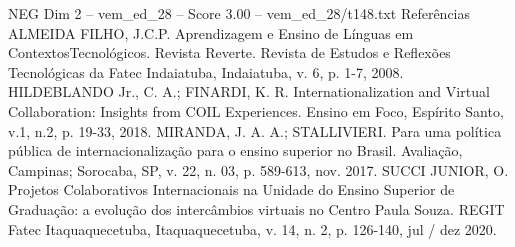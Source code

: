 \begin{textsample}{NEG Dim 2 – vem\_ed\_28 – Score 3.00 – vem\_ed\_28/t148.txt}
Referências ALMEIDA FILHO, J.C.P.
Aprendizagem e Ensino de Línguas em ContextosTecnológicos.
Revista Reverte.
Revista de Estudos e Reflexões Tecnológicas da Fatec Indaiatuba, Indaiatuba, v. 6, p. 1-7, 2008.
HILDEBLANDO Jr., C.
A.; FINARDI, K.
R.
Internationalization and Virtual Collaboration: Insights from COIL Experiences.
Ensino em Foco, Espírito Santo, v.1, n.2, p. 19-33, 2018.
MIRANDA, J.
A.
A.; STALLIVIERI.
Para uma política pública de internacionalização para o ensino superior no Brasil.
Avaliação, Campinas; Sorocaba, SP, v. 22, n. 03, p. 589-613, nov. 2017.
SUCCI JUNIOR, O.
Projetos Colaborativos Internacionais na Unidade do Ensino Superior de Graduação: a evolução dos intercâmbios virtuais no Centro Paula Souza.
REGIT Fatec Itaquaquecetuba, Itaquaquecetuba, v. 14, n. 2, p. 126-140, jul / dez 2020.

\end{textsample}
